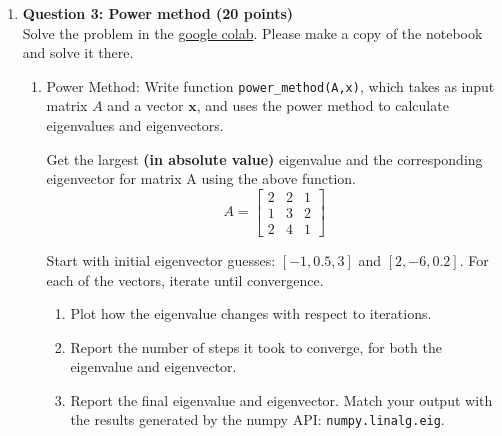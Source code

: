 \documentclass[11pt,letterpaper]{article}
\begin{document}
\begin{enumerate}
But this is a contradiction. The assumption has stated that by the definition of eigenvectors, \( Ax_1 = \lambda_1 x_1 \). Also, because \( A = \lambda_1 \) further substition demonstrates the following contradiction:

\begin{align*}
\lambda_1 x_1 &= \lambda_2 x_2 \\
x_1 &= x_2
\end{align*}

which is nonsense if the eigenvectors are linearly independent (one is not a scalar of another). Therefore \( x_1 \) and \( x_2 \) are NOT linearly independent. A similar argument can be made for any case with \( n > 2 \), for any scalar c \( \in \mathbb{R} \).

\clearpage
\item[] \textbf{Question 3: Power method (20 points)} \\

Solve the problem in the \href{https://drive.google.com/file/d/1cOb-zLjKqcIPwESdG55NyQ26GIms09Z2/view?usp=drive_link}{google colab}. Please make a copy of the notebook and solve it there.

\begin{enumerate}[label=(\alph*)]
\item Power Method:
Write function \texttt{power\_method(A,x)}, which takes as input matrix $A$ and a vector $\mathbf{x}$, and uses the power method to calculate eigenvalues and eigenvectors.

Get the largest \textbf{(in absolute value)} eigenvalue and the corresponding eigenvector for matrix A using the above function.
$$A=\begin{bmatrix}
2 & 2 & 1 \\
1 & 3 & 2 \\
2 & 4 & 1
\end{bmatrix} $$

Start with initial eigenvector guesses: $[-1, 0.5, 3]$ and $[2,-6,0.2]$. For each of the vectors, iterate until convergence.
\begin{enumerate}[label=\roman*.]
    \item Plot how the eigenvalue changes with respect to iterations.
    \item Report the number of steps it took to converge, for both the eigenvalue and eigenvector.
    \item Report the final eigenvalue and eigenvector. Match your output with the results generated by the numpy API: \texttt{numpy.linalg.eig}.\\
\end{enumerate}


\end{enumerate}
\end{enumerate}
\end{document}
